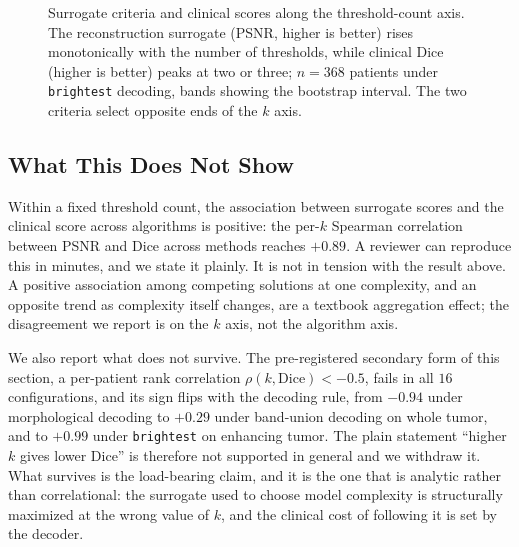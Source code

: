 \begin{figure}[t]
  \centering
  \caption{Surrogate criteria and clinical scores along the threshold-count
  axis. The reconstruction surrogate (PSNR, higher is better) rises monotonically
  with the number of thresholds, while clinical Dice (higher is better) peaks at
  two or three; $n=368$ patients under \texttt{brightest} decoding, bands showing
  the bootstrap interval. The two criteria select opposite ends of the $k$
  axis.}
  \label{fig:goodhart}
\end{figure}

\subsection{What This Does Not Show}

Within a fixed threshold count, the association between surrogate scores and the
clinical score across algorithms is positive: the per-$k$ Spearman correlation
between PSNR and Dice across methods reaches $+0.89$. A reviewer can reproduce
this in minutes, and we state it plainly. It is not in tension with the result
above. A positive association among competing solutions at one complexity, and an
opposite trend as complexity itself changes, are a textbook aggregation effect;
the disagreement we report is on the $k$ axis, not the algorithm axis.

We also report what does not survive. The pre-registered secondary form of this
section, a per-patient rank correlation $\rho(k,\mathrm{Dice}) < -0.5$,
fails in all $16$ configurations, and its sign flips with the decoding rule, from
$-0.94$ under morphological decoding to $+0.29$ under band-union decoding on whole
tumor, and to $+0.99$ under \texttt{brightest} on enhancing tumor. The plain
statement ``higher $k$ gives lower Dice'' is therefore not supported in general
and we withdraw it. What survives is the load-bearing claim, and it is the one
that is analytic rather than correlational: the surrogate used to choose model
complexity is structurally maximized at the wrong value of $k$, and the clinical
cost of following it is set by the decoder.
